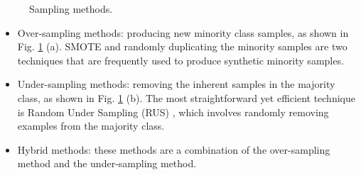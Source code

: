 \documentclass[10pt,journal,compsoc]{IEEEtran}
\begin{document}
	\begin{figure}[h]
		\centering 
		\hfil
		\caption{Sampling methods.}
		\label{Sampling methods}
	\end{figure}
	
	\begin{itemize}
		\item  Over-sampling methods: producing new minority class samples, as shown in Fig. \ref{Sampling methods} (a). SMOTE \cite{chawla2002smote} and randomly duplicating the minority samples are two techniques that are frequently used to produce synthetic minority samples. 
		
		\item Under-sampling methods: removing the inherent samples in the majority class, as shown in Fig. \ref{Sampling methods} (b). The most straightforward yet efficient technique is Random Under Sampling (RUS) \cite{tahir2009multiple}, which involves randomly removing examples from the majority class.
		
		\item  Hybrid methods: these methods are a combination of the over-sampling method and the under-sampling method.
	\end{itemize}
	
\end{document}
